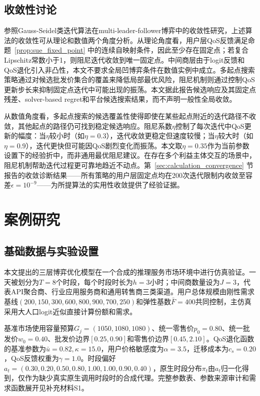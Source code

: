 \documentclass[UTF8,11pt]{ctexart}
\begin{document}
\subsection{收敛性讨论}

参照Gauss-Seidel类迭代算法在multi-leader-follower博弈中的收敛性研究\cite{wang2026hierarchical}，上述算法的收敛性可从理论和数值两个角度分析。从理论角度看，用户层QoS反馈满足命题~\ref{prop:sue_fixed_point} 中的连续自映射条件，因此至少存在固定点；若复合Lipschitz常数小于1，则阻尼迭代收敛到唯一固定点。中间商层由于logit反馈和QoS退化引入非凸性，本文不要求全局凹博弈条件在数值实例中成立。多起点搜索策略通过对候选批发价集合的覆盖来降低局部最优风险，阻尼机制则通过控制QoS更新步长来抑制固定点迭代中可能出现的振荡。本文据此报告候选响应及其固定点残差、solver-based regret和平台候选搜索结果，而不声明一般性全局收敛。

从数值角度看，多起点搜索的候选覆盖性使得即使在某些起点附近的迭代路径不收敛，其他起点的路径仍可找到稳定候选响应。阻尼系数$\eta$控制了每次迭代中QoS更新的幅度：当$\eta$较小时（如$\eta=0.3$），迭代收敛更稳定但速度较慢；当$\eta$较大时（如$\eta=0.9$），迭代更快但可能因QoS剧烈变化而振荡。本文取$\eta=0.35$作为当前参数设置下的经验折中，而非通用最优阻尼建议。在存在多个利益主体交互的场景中，阻尼机制帮助迭代过程更可靠地趋近不动点。第~\ref{sec:calculation_convergence} 节报告的收敛诊断结果——所有策略的用户层固定点均在200次迭代限制内收敛至容差$\epsilon=10^{-9}$——为所提算法的实用性收敛提供了经验证据。

\section{案例研究}
\label{sec:case_study}

\subsection{基础数据与实验设置}
\label{sec:basic_data}

本文提出的三层博弈优化模型在一个合成的推理服务市场环境中进行仿真验证。一天被划分为$T=8$个时段，每个时段时长为$h=3$小时；中间商数量设为$J=3$，代表API聚合商、行业应用服务商和通用转售商三类渠道。用户总体规模由刚性需求基线$(200,150,300,600,800,900,700,250)$和弹性基数$\bar F=400$共同控制，主仿真采用大人口logit近似直接计算份额和需求。

基准市场使用容量预算$G_j=(1050,1080,1080)$、统一零售价$p_0=0.80$、统一批发价$w_0=0.40$、批发价边界$[0.25,0.90]$和零售价边界$[0.45,2.10]$。QoS退化函数的基准参数为$\bar u=0.82,\kappa=15.0$，用户价格敏感度为$\alpha=3.5$，迁移成本为$c_s=0.20$，QoS反馈权重为$\gamma=1.0$。时段偏好$a_t=(0.30,0.20,0.50,0.80,1.00,1.00,0.90,0.40)$，原生时段分布$\pi_t$由$a_t$归一化得到，仅作为缺少真实原生调用时段时的合成代理。完整参数表、参数来源审计和需求函数展开见补充材料S1。
\end{document}
